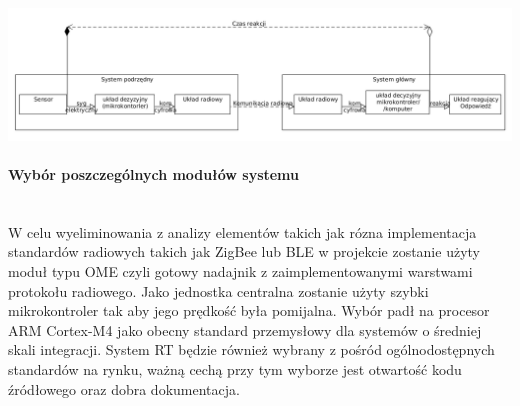 \centerline{\includegraphics[scale=0.40]{./img/target_system/badany_system.png}} 

\paragraph{Wybór poszczególnych modułów systemu} \mbox{}\\
\tab W celu wyeliminowania z analizy elementów takich jak rózna implementacja standardów radiowych takich jak ZigBee lub BLE w projekcie zostanie użyty moduł typu OME czyli gotowy nadajnik z zaimplementowanymi warstwami protokołu radiowego.
Jako jednostka centralna zostanie użyty szybki mikrokontroler tak aby jego prędkość była pomijalna. Wybór padł na procesor ARM Cortex-M4 jako obecny standard przemysłowy dla systemów o średniej skali integracji.
System RT będzie również wybrany z pośród ogólnodostępnych standardów na rynku, ważną cechą przy tym wyborze jest otwartość kodu źródłowego oraz dobra dokumentacja.

